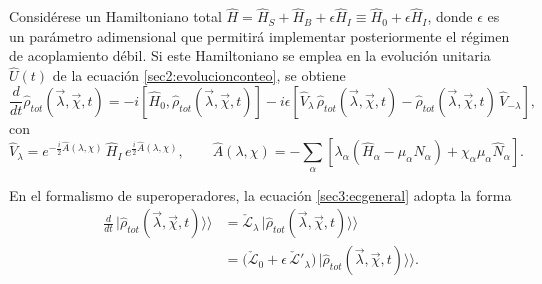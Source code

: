 Considérese un Hamiltoniano total 
\(\hat{H} = \hat{H}_{S} + \hat{H}_{B} + \epsilon \hat{H}_{I} \equiv \hat{H}_{0} + \epsilon \hat{H}_{I}\),
donde \(\epsilon\) es un parámetro adimensional que permitirá implementar posteriormente el régimen de acoplamiento débil. Si este Hamiltoniano se emplea en la evolución unitaria \(\hat{U}(t)\) de la ecuación \eqref{sec2:evolucionconteo}, se obtiene
\begin{equation}
    \frac{d}{dt}\hat{\rho}_{tot}(\vec{\lambda},\vec{\chi},t) 
    = -i[\hat{H}_{0},\hat{\rho}_{tot}(\vec{\lambda},\vec{\chi},t)]
      - i\epsilon\!\left[\hat{V}_{\lambda}\,\hat{\rho}_{tot}(\vec{\lambda},\vec{\chi},t)
      - \hat{\rho}_{tot}(\vec{\lambda},\vec{\chi},t)\,\hat{V}_{-\lambda}\right],
    \label{sec3:ecgeneral}
\end{equation}
con
\begin{equation*}
    \hat{V}_{\lambda} 
    = e^{-\frac{i}{2}\hat{A}(\lambda,\chi)}\,\hat{H}_{I}\,e^{\frac{i}{2}\hat{A}(\lambda,\chi)},
    \qquad 
    \hat{A}(\lambda,\chi) 
    = -\sum_{\alpha}\!\left[\lambda_{\alpha}(\hat{H}_{\alpha}-\mu_{\alpha}\hat{N}_{\alpha})
      + \chi_{\alpha}\mu_{\alpha}\hat{N}_{\alpha}\right].
\end{equation*}

En el formalismo de superoperadores, la ecuación \eqref{sec3:ecgeneral} adopta la forma
\begin{align*}
    \frac{d}{dt}\,|\hat{\rho}_{tot}(\vec{\lambda},\vec{\chi},t)\rangle\rangle
    &= \check{\mathcal{L}}_{\lambda}\,|\hat{\rho}_{tot}(\vec{\lambda},\vec{\chi},t)\rangle\rangle \\
    &= \big(\check{\mathcal{L}}_{0} + \epsilon\,\check{\mathcal{L}}'_{\lambda}\big)\,
       |\hat{\rho}_{tot}(\vec{\lambda},\vec{\chi},t)\rangle\rangle .
\end{align*}

